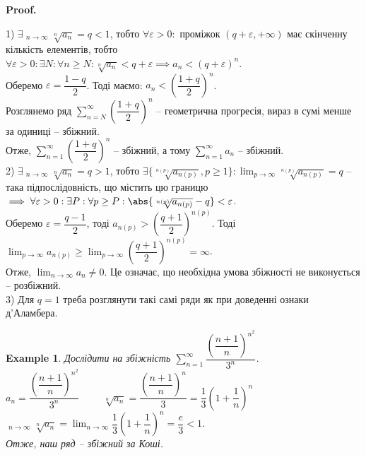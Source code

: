 \documentclass[a4paper, 10pt]{article}
\makeatletter
\DeclareMathOperator*\uplim{\overline{lim}}
\def\huge{\displaystyle}
\def\qed{$\blacksquare$}
\theoremstyle{theoremdd}
\theoremstyle{theoremdd}
\theoremstyle{theoremdd}
\theoremstyle{theoremdd}
\theoremstyle{theoremdd}
\newtheorem{example}[theorem]{Example}
\theoremstyle{theoremdd}
\theoremstyle{theoremdd}
\theoremstyle{theoremdd}
\theoremstyle{theoremdd}
\renewenvironment{proof}[1][Proof.\\]{\par
\pushQED{\hfill \qed}%
\normalfont \topsep6\p@\@plus6\p@\relax
\trivlist
\item\relax
{\bfseries
#1\@addpunct{.}}\hspace\labelsep\ignorespaces
}{%
\popQED\endtrivlist\@endpefalse
}
\makeatother
\begin{document}
\begin{proof}
1) $\exists \huge \uplim_{n \to \infty} \sqrt[n]{a_n} = q < 1$, тобто $\forall \varepsilon > 0:$ проміжок $(q+\varepsilon,+\infty)$ має скінченну кількість елементів, тобто \\ 
$\forall \varepsilon > 0: \exists N: \forall n \geq N: \sqrt[n]{a_n} < q + \varepsilon \implies a_n < (q + \varepsilon)^n$.\\
Оберемо $\varepsilon = \dfrac{1-q}{2}$. Тоді маємо: $a_n < \left( \dfrac{1+q}{2} \right)^n$.\\
Розглянемо ряд $\huge \sum_{n = N}^{\infty} \left( \dfrac{1+q}{2} \right)^n$ -- геометрична прогресія, вираз в сумі менше за одиниці -- збіжний.\\
Отже, $\huge \sum_{n = 1}^{\infty} \left( \dfrac{1+q}{2} \right)^n$ -- збіжний, а тому $\huge \sum_{n=1}^{\infty} a_n$ -- збіжний.
\bigskip \\
2) $\exists \huge \uplim_{n \to \infty} \sqrt[n]{a_n} = q > 1$, тобто $\exists \{\sqrt[n(p)]{a_{n(p)}}, p \geq 1 \}: \huge \lim_{p \to \infty} \sqrt[n(p)]{a_{n(p)}} = q$ -- така підпослідовність, що містить цю границю $\implies \forall \varepsilon > 0: \exists P: \forall p \geq P: \abs{\sqrt[n(p)]{a_{n(p)}} - q} < \varepsilon$.\\
Оберемо $\varepsilon = \dfrac{q-1}{2}$, тоді $a_{n(p)} > \left( \dfrac{q+1}{2} \right)^{n(p)}$. Тоді $\huge \lim_{p \to \infty} a_{n(p)} \geq \lim_{p \to \infty} \left( \dfrac{q+1}{2} \right)^{n(p)} = \infty$.\\
Отже, $\huge \lim_{n \to \infty} a_n \neq 0$. Це означає, що необхідна умова збіжності не виконується -- розбіжний.
\bigskip \\
3) Для $q=1$ треба розглянути такі самі ряди як при доведенні ознаки д'Аламбера.
\end{proof}

\begin{example}
Дослідити на збіжність $\huge\sum_{n=1}^\infty \dfrac{\left( \dfrac{n+1}{n} \right)^{n^2}}{3^n}$.\\
$a_n = \dfrac{\left( \dfrac{n+1}{n} \right)^{n^2}}{3^n} \hspace{1cm} \sqrt[n]{a_n} = \dfrac{\left( \dfrac{n+1}{n} \right)^n}{3} = \dfrac{1}{3} \left( 1 + \dfrac{1}{n} \right)^n$\\
$\huge\uplim_{n \to \infty} \sqrt[n]{a_n} = \lim_{n \to \infty} \dfrac{1}{3} \left( 1 + \dfrac{1}{n} \right)^n = \dfrac{e}{3} < 1$.\\
Отже, наш ряд -- збіжний за Коші.
\end{example}
\end{document}

